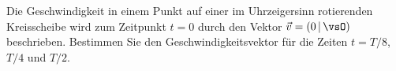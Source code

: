 Die Geschwindigkeit in einem Punkt auf einer im Uhrzeigersinn rotierenden Kreisscheibe wird zum Zeitpunkt $t = 0$ durch den Vektor $\vec v = \left(0\,\middle|\,\vsO\right)$ beschrieben. Bestimmen Sie den Geschwindigkeitsvektor für die Zeiten $t = T/8$, $T/4$ und $T/2$.
